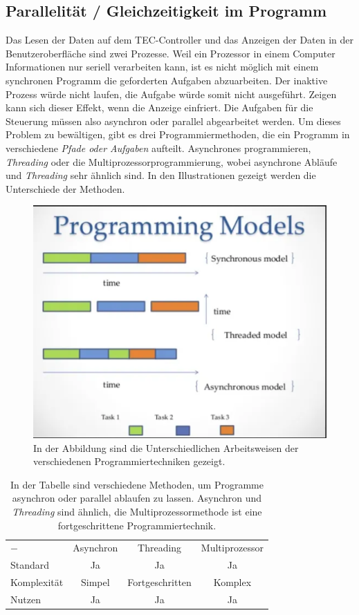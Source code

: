 \subsection{Parallelität / Gleichzeitigkeit im Programm}
Das Lesen der Daten auf dem TEC-Controller und das Anzeigen der Daten in der Benutzeroberfläche sind zwei Prozesse. Weil ein Prozessor in einem Computer Informationen nur seriell verarbeiten kann, ist es nicht möglich mit einem synchronen Programm die geforderten Aufgaben abzuarbeiten. Der  inaktive Prozess würde nicht laufen, die Aufgabe würde somit nicht ausgeführt. Zeigen kann sich dieser Effekt, wenn die Anzeige einfriert. Die Aufgaben für die Steuerung müssen also asynchron oder parallel abgearbeitet werden. Um dieses Problem zu bewältigen, gibt es drei Programmiermethoden, die ein Programm in verschiedene \textit{Pfade oder Aufgaben} aufteilt. Asynchrones programmieren, \textit{Threading} oder die Multiprozessorprogrammierung, wobei asynchrone Abläufe und \textit{Threading} sehr ähnlich sind. In den Illustrationen gezeigt werden die Unterschiede der Methoden.

\begin{figure}[H]
    \centering
    \includegraphics[scale=0.6]{98_images/threading_asynchronous.PNG}
    \caption{In der Abbildung sind die Unterschiedlichen Arbeitsweisen der verschiedenen Programmiertechniken gezeigt.}
    \label{fig:multi_threading_async}
\end{figure}

\begin{table}[H]
    \centering
    \begin{tabular}{|l|c|c|c|}
         $-$&Asynchron &Threading &Multiprozessor\\
         Standard&Ja &Ja  &Ja\\
         Komplexität &Simpel &Fortgeschritten &Komplex\\
         Nutzen &Ja &Ja &Ja
    \end{tabular}
    \caption{In der Tabelle sind verschiedene Methoden, um Programme asynchron oder parallel ablaufen zu lassen. Asynchron und \textit{Threading} sind ähnlich, die Multiprozessormethode ist eine fortgeschrittene Programmiertechnik.}
    \label{tab:async_threading_multiprocessor}
\end{table}

